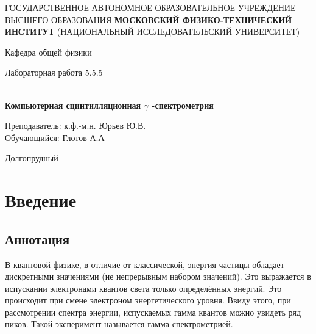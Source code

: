 \documentclass[12pt,a4paper]{article}
\author{Глотов Алексей}
\begin{document}
\newpage
\begin{center}
\footnotesize{{ГОСУДАРСТВЕННОЕ АВТОНОМНОЕ ОБРАЗОВАТЕЛЬНОЕ УЧРЕЖДЕНИЕ}\break
{ВЫСШЕГО ОБРАЗОВАНИЯ}
\break
{\bf {МОСКОВСКИЙ ФИЗИКО-ТЕХНИЧЕСКИЙ ИНСТИТУТ}}
\break
\small{(НАЦИОНАЛЬНЫЙ ИССЛЕДОВАТЕЛЬСКИЙ УНИВЕРСИТЕТ)}}
\break
\hfill \break
\hfill \break
\begin{center}
\normalsize{Кафедра общей физики}
\end{center}
\hfill \break
\hfill \break
\hfill \break
\hfill \break

\begin{center}
\normalsize {Лабораторная работа 5.5.5}
\end{center}
\hfill \break\\
\large{\textbf{Компьютерная сцинтилляционная $\gamma$ -спектрометрия}}
\end{center}
\begin{flushleft}
\hfill \break
\hfill \break
\hfill \break
\hfill \break
\hfill \break
\hfill \break
\hfill \break
\hfill \break
\hfill \break
\hfill \break
\hangindent=10cm
\normalsize{Преподаватель:} \;\;\;\;
\normalsize{к.ф.-м.н. Юрьев Ю.В.}\\
\hfill \break
\normalsize{Обучающийся:} \;\;\;\;\;
\normalsize{Глотов А.А} \\
\hfill \break
\end{flushleft}
\hfill \break
\hfill \break
\hfill \break
\hfill \break
\hfill \break
\hfill \break
\hfill \break
\hfill \break
\hfill \break
\hfill \break
\hfill \break

\begin{center}
Долгопрудный 
\end{center}

\thispagestyle{empty}


\newpage
\section{Введение}

\subsection{Аннотация}

В квантовой физике, в отличие от классической, энергия частицы обладает дискретными значениями (не непрерывным набором значений). Это выражается в испускании электронами квантов света только определённых энергий. Это происходит при смене электроном энергетического уровня. Ввиду этого, при рассмотрении спектра энергии, испускаемых гамма квантов можно увидеть ряд пиков. Такой эксперимент называется гамма-спектрометрией.
\end{document}
